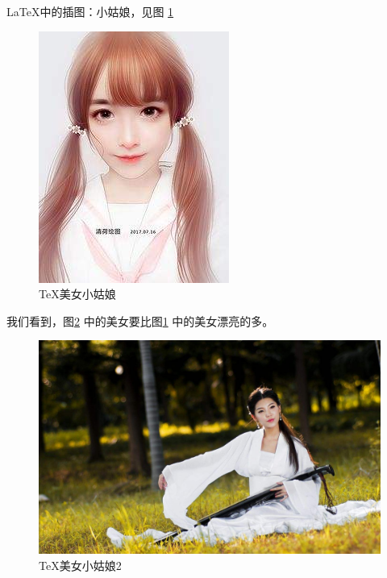 \documentclass{ctexart} %
\begin{document}
	\LaTeX{}中的插图：小姑娘，见图
	\ref{fig-girls} %
	\begin{figure}[htbp]%
		\centering
		\includegraphics[scale=0.3]{girls} 
		
		\caption{\TeX 美女小姑娘}
		\label{fig-girls} %
	\end{figure}
	
	
	我们看到，图\ref{fig-girls2} 中的美女要比图\ref{fig-girls} 中的美女漂亮的多。
	\begin{figure}[htbp]%
		\centering
		\includegraphics[scale=0.2]{girls2} 
		
		\caption{\TeX 美女小姑娘2}
		\label{fig-girls2} %
	\end{figure}
	
\end{document}
